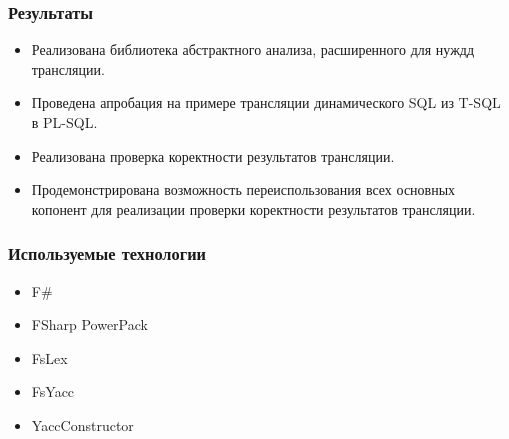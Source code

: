 \documentclass{beamer}
\begin{document}
\begin{frame}%
	\transwipe[direction=90]
	\frametitle{Результаты}
	\begin{itemize}
		\item Реализована библиотека абстрактного анализа, расширенного для нуждд трансляции.
        \item Проведена апробация на примере трансляции динамического SQL из T-SQL в PL-SQL.
        \item Реализована проверка коректности результатов трансляции.
        \item Продемонстрирована возможность переиспользования всех основных копонент для реализации проверки коректности результатов трансляции.
	\end{itemize}
\end{frame}

\begin{frame}
	\transwipe[direction=90]
	\frametitle{Используемые технологии}
	\begin{itemize}
		\item F\#
        \item FSharp PowerPack
        \item FsLex
        \item FsYacc
        \item YaccConstructor
	\end{itemize}
\end{frame}
\end{document}
